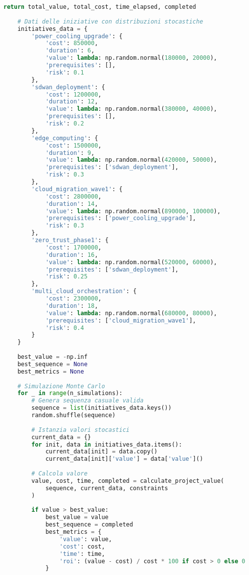 \begin{lstlisting}[language=Python, caption=Algoritmo di Ottimizzazione Roadmap con Vincoli]
        return total_value, total_cost, time_elapsed, completed
    
    # Dati delle iniziative con distribuzioni stocastiche
    initiatives_data = {
        'power_cooling_upgrade': {
            'cost': 850000,
            'duration': 6,
            'value': lambda: np.random.normal(180000, 20000),
            'prerequisites': [],
            'risk': 0.1
        },
        'sdwan_deployment': {
            'cost': 1200000,
            'duration': 12,
            'value': lambda: np.random.normal(380000, 40000),
            'prerequisites': [],
            'risk': 0.2
        },
        'edge_computing': {
            'cost': 1500000,
            'duration': 9,
            'value': lambda: np.random.normal(420000, 50000),
            'prerequisites': ['sdwan_deployment'],
            'risk': 0.3
        },
        'cloud_migration_wave1': {
            'cost': 2800000,
            'duration': 14,
            'value': lambda: np.random.normal(890000, 100000),
            'prerequisites': ['power_cooling_upgrade'],
            'risk': 0.3
        },
        'zero_trust_phase1': {
            'cost': 1700000,
            'duration': 16,
            'value': lambda: np.random.normal(520000, 60000),
            'prerequisites': ['sdwan_deployment'],
            'risk': 0.25
        },
        'multi_cloud_orchestration': {
            'cost': 2300000,
            'duration': 18,
            'value': lambda: np.random.normal(680000, 80000),
            'prerequisites': ['cloud_migration_wave1'],
            'risk': 0.4
        }
    }
    
    best_value = -np.inf
    best_sequence = None
    best_metrics = None
    
    # Simulazione Monte Carlo
    for _ in range(n_simulations):
        # Genera sequenza casuale valida
        sequence = list(initiatives_data.keys())
        random.shuffle(sequence)
        
        # Istanzia valori stocastici
        current_data = {}
        for init, data in initiatives_data.items():
            current_data[init] = data.copy()
            current_data[init]['value'] = data['value']()
        
        # Calcola valore
        value, cost, time, completed = calculate_project_value(
            sequence, current_data, constraints
        )
        
        if value > best_value:
            best_value = value
            best_sequence = completed
            best_metrics = {
                'value': value,
                'cost': cost,
                'time': time,
                'roi': (value - cost) / cost * 100 if cost > 0 else 0
            }
    

\end{lstlisting}
